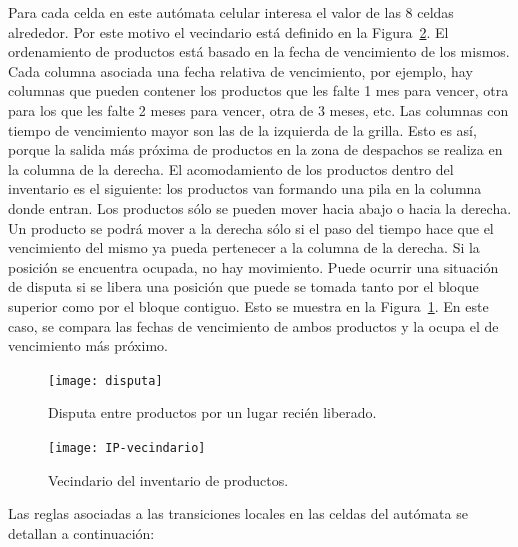 \documentclass[10pt]{article}
\begin{document}
Para cada celda en este autómata celular interesa el valor de las $8$ celdas alrededor. Por este motivo el vecindario está definido en la Figura~\ref{fig:IP-vecindario}. El ordenamiento de productos está basado en la fecha de vencimiento de los mismos. Cada columna asociada una fecha relativa de vencimiento, por ejemplo, hay columnas que pueden contener los productos que les falte 1 mes para vencer, otra para los que les falte 2 meses para vencer, otra de 3 meses, etc. Las columnas con tiempo de vencimiento mayor son las de la izquierda de la grilla. Esto es así, porque la salida más próxima de productos en la zona de despachos se realiza en la columna de la derecha.
El acomodamiento de los productos dentro del inventario es el siguiente: los productos van formando una pila en la columna donde entran. Los productos sólo se pueden mover hacia abajo o hacia la derecha. Un producto se podrá mover a la derecha sólo si el paso del tiempo hace que el vencimiento del mismo ya pueda pertenecer a la columna de la derecha. Si la posición se encuentra ocupada, no hay movimiento.
Puede ocurrir una situación de disputa si se libera una posición que puede se tomada tanto por el bloque superior como por el bloque contiguo. Esto se muestra en la Figura~\ref{fig:IP-disputa}. En este caso, se compara las fechas de vencimiento de ambos productos y la ocupa el de vencimiento más próximo.

\begin{figure}[h] 
	\centering 
	\texttt{[image: disputa]} 
	\caption{Disputa entre productos por un lugar recién liberado.} 
	\label{fig:IP-disputa} 
\end{figure}
\FloatBarrier

\begin{figure}[h] 
  \centering 
  \texttt{[image: IP-vecindario]} 
  \caption{Vecindario del inventario de productos.} 
  \label{fig:IP-vecindario} 
\end{figure}
\FloatBarrier

Las reglas asociadas a las transiciones locales en las celdas del autómata se detallan a continuación:
\end{document}
